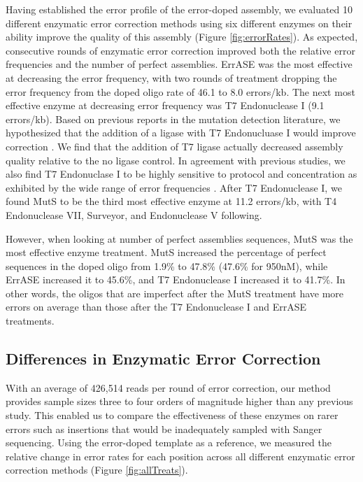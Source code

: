 \documentclass[letterpaper,12pt]{article}
\begin{document}
Having established the error profile of the error-doped assembly, we evaluated 10 different enzymatic error correction methods using six different enzymes on their ability improve the quality of this assembly (Figure \ref{fig:errorRates}). As expected, consecutive rounds of enzymatic error correction improved both the relative error frequencies and the number of perfect assemblies. ErrASE was the most effective at decreasing the error frequency, with two rounds of treatment dropping the error frequency from the doped oligo rate of 46.1 to 8.0 errors/kb. The next most effective enzyme at decreasing error frequency was T7 Endonuclease I (9.1 errors/kb). Based on previous reports in the mutation detection literature, we hypothesized that the addition of a ligase with T7 Endonucluase I would improve correction \cite{huang2012}. We find that the addition of T7 ligase actually decreased assembly quality relative to the no ligase control. In agreement with previous studies, we also find T7 Endonuclase I to be highly sensitive to protocol and concentration as exhibited by the wide range of error frequencies \cite{fuhrmann2005,sequeira2016}. After T7 Endonuclease I, we found MutS to be the third most effective enzyme at 11.2 errors/kb, with T4 Endonuclease VII, Surveyor, and Endonuclease V following.

However, when looking at number of perfect assemblies sequences, MutS was the most effective enzyme treatment. MutS increased the percentage of perfect sequences in the doped oligo from 1.9\% to 47.8\% (47.6\% for 950nM), while ErrASE increased it to 45.6\%, and T7 Endonuclease I increased it to 41.7\%. In other words, the oligos that are imperfect after the MutS treatment have more errors on average than those after the T7 Endonuclease I and ErrASE treatments.


\subsection*{Differences in Enzymatic Error Correction}

With an average of 426,514 reads per round of error correction, our method provides sample sizes three to four orders of magnitude higher than any previous study. This enabled us to compare the effectiveness of these enzymes on rarer errors such as insertions that would be inadequately sampled with Sanger sequencing. Using the error-doped template as a reference, we measured the relative change in error rates for each position across all different enzymatic error correction methods (Figure \ref{fig:allTreats}).
\end{document}
